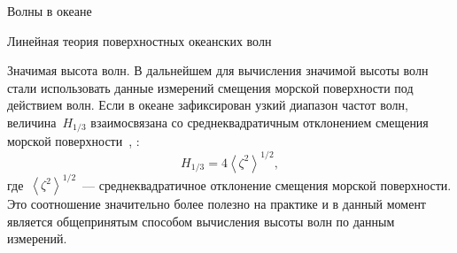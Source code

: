 \begin{chapter}{Волны в океане}
\begin{section}{Линейная теория поверхностных океанских волн}
\begin{paragraph}{Значимая высота волн.}
В дальнейшем для вычисления значимой высоты волн стали использовать данные
измерений смещения морской поверхности под действием волн. Если в океане
зафиксирован узкий диапазон частот волн, величина~$H_{1/3}$ взаимосвязана
со среднеквадратичным отклонением смещения морской поверхности~\cite{NAS:1963},
\cite{Hoffman:1975}:
\begin{equation}
 H_{1/3} = 4 \left< \zeta ^{2}\right>^{1/2},
\end{equation}
где~$ \left< \zeta ^{2}\right>^{1/2}$~--- среднеквадратичное отклонение
смещения морской поверхности. Это соотношение значительно более полезно
на практике и в данный момент является общепринятым способом вычисления
высоты волн по данным измерений.
%
\end{paragraph}
\end{section}


\end{chapter}
